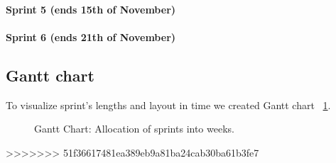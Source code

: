 \documentclass{report}
\begin{document}
\paragraph{Sprint 5 (ends 15th of November)}
\paragraph{Sprint 6 (ends 21th of November)}
\subsection{Gantt chart}
To visualize sprint's lengths and layout in time we created Gantt chart ~\ref{fig:gantt}.


\begin{figure}
\begin{center}
\label{fig:gantt}
\caption{Gantt Chart: Allocation of sprints into weeks.}
\begin{sideways}
\begin{gantt}{9}{14}
    \begin{ganttitle}
    \end{ganttitle}
    \begin{ganttitle}
    \end{ganttitle}
\end{gantt}
\end{sideways}
\end{center}
\end{figure}

>>>>>>> 51f36617481ea389eb9a81ba24cab30ba61b3fe7
\end{document}
